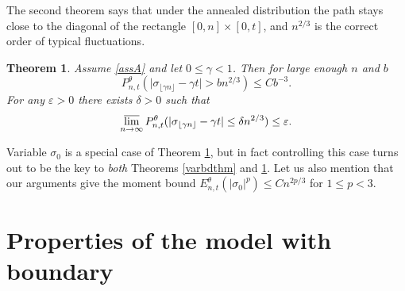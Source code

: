 \documentclass[11pt]{amsart}
\newtheorem{theorem}{\sc Theorem}[section]
\numberwithin{equation}{section}
\theoremstyle{remark}
\providecommand{\abs}[1]{\vert#1\vert}
\begin{document}
The second theorem says that under the annealed distribution 
  the path stays close to the diagonal of the rectangle $[0,n]\times[0,t]$, and 
  $n^{2/3}$ is the correct order of typical fluctuations.   

\begin{theorem}\label{path-thm1} 
Assume \eqref{assA}   and   let $0\le \gamma<1$.   Then for
large enough $n$ and $b$ 
 \begin{equation} \label{path11}
P^{\theta}_{n,t}(\abs{\sigma_{\lfloor \gamma n \rfloor }-\gamma t}>b n^{2/3})\le C b^{-3}.
\end{equation} 
 For any  $\varepsilon>0$ there exists $\delta>0$ such that  
\begin{equation}\label{path21} 
\varlimsup_{n\to \infty}P^{\theta}_{n,t}(|\sigma_{\lfloor \gamma n \rfloor }-\gamma t|\le \delta n^{2/3})\le \varepsilon.
\end{equation} 
\end{theorem}

Variable  $\sigma_0$ is a special case of Theorem \ref{path-thm1}, but in fact
controlling this case turns out to be the key to {\sl both} Theorems  \ref{varbdthm} and
 \ref{path-thm1}.  Let us also mention that  our arguments give the 
 moment bound $E^{\theta}_{n,t}(\abs{\sigma_0}^p)\le Cn^{2p/3}$ for $1\le p<3$.  
 

\section{Properties of the model with boundary}
\end{document}
